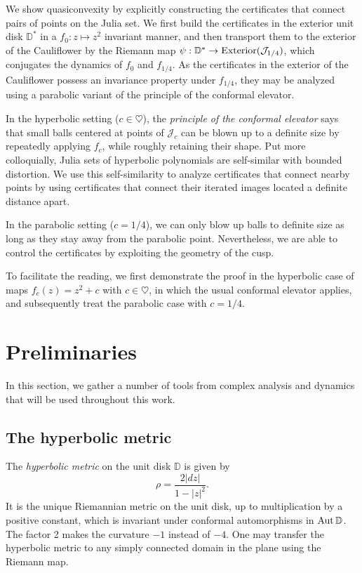 We show quasiconvexity by explicitly constructing the certificates that connect pairs of points on the Julia set.
We first build the certificates in the exterior unit disk $\mathbb D ^*$ in a  $f_0: z\mapsto z^2$ invariant manner, and then transport them to the exterior of the Cauliflower by the Riemann map $\psi: \mathbb D ^* \to \operatorname{Exterior}(\mathcal J_{1 / 4})$, 
which conjugates the dynamics of $f_0$ and $f_{1/4}$. As the certificates in the exterior of the Cauliflower possess an invariance property under $f_{1/4}$, they may be analyzed using a parabolic variant of the principle of the conformal elevator.

In the hyperbolic setting ($c \in \heartsuit$), the {\em principle of the conformal elevator} says that small balls centered at points of $\mathcal J_c$ can be blown up to a definite size by repeatedly applying $f_c$, while roughly retaining their shape. Put more colloquially, Julia sets of hyperbolic polynomials are self-similar with bounded distortion. We use this self-similarity to analyze certificates that connect nearby points by using certificates that connect their iterated images located a definite distance apart. 

In the parabolic setting ($c=1/4$), we can only blow up balls to definite size as long as they stay away from the parabolic point. Nevertheless, we are able to control the certificates by exploiting the geometry of the cusp.


To facilitate the reading, we first demonstrate the proof in the hyperbolic case of maps $f_c(z)=z^2+c$ with 
$c\in \heartsuit$, in which the usual conformal elevator applies, 
and subsequently treat the parabolic case with $c= 1/4$.

\section{Preliminaries}

In this section, we gather a number of tools from complex analysis and dynamics that will be used throughout this work.

\subsection{The hyperbolic metric}
	The {\em hyperbolic metric} on the unit disk $\mathbb D$ is given by
	\begin{equation}
	\label{eq:hyp-metric-in-disk}
		\rho = \frac {2|dz|}{1-|z|^2}.
	\end{equation}
It is the unique Riemannian metric on the unit disk, up to multiplication by a positive constant, which is invariant under conformal automorphisms in $\operatorname{Aut} \mathbb{D}$. The factor 2 makes the curvature $-1$ instead of $-4$. One may transfer the hyperbolic metric to any simply connected domain in the plane using the Riemann map.

